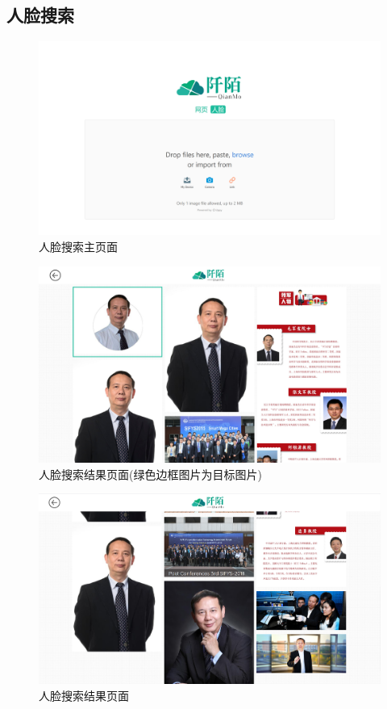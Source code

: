 \documentclass[a4paper]{article}
\begin{document}
        \subsection{人脸搜索}
        \label{face_demo}
\begin{figure}[H]
\centering
\includegraphics[width=\textwidth]{image/face1.png}
\caption{人脸搜索主页面}
\end{figure}
\begin{figure}[H]
\centering
\includegraphics[width=\textwidth]{image/face2.jpg}
\caption{人脸搜索结果页面(绿色边框图片为目标图片)}
\end{figure}
\begin{figure}[H]
\centering
\includegraphics[width=\textwidth]{image/face3.png}
\caption{人脸搜索结果页面}
\end{figure}
    \newpage
\end{document}
